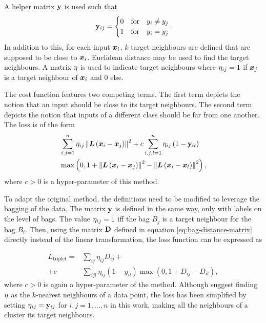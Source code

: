A helper matrix \( \mathbf{y} \) is used such that
\[ \phantom{.}\mathbf{y}_{ij} = \begin{cases}
	0 &\text{for} \quad y_i \neq y_j \\
	1 &\text{for} \quad y_i = y_j \\
\end{cases}. \]
In addition to this, for each input \( \bm{x}_i \), \( k \) target neighbours are defined that are supposed to be close to \( \bm{x}_i \). Euclidean distance may be used to find the target neighbours. A matrix \( \mathbf{\eta} \) is used to indicate target neighbours where \( \mathbf{\eta}_{ij} = 1 \) if \( \bm{x}_j \) is a target neighbour of \( \bm{x}_i \) and \( 0 \) else.

The cost function features two competing terms. The first term depicts the notion that an input should be close to its target neighbours. The second term depicts the notion that inputs of a different class should be far from one another. The loss is of the form
\begin{align*}
	&\sum_{i, j = 1}^n \mathbf{\eta}_{ij} \left\lVert \bm{L} \left( \bm{x}_i - \bm{x}_j \right) \right\rVert^2 + c \sum_{i, j, l = 1}^n \mathbf{\eta}_{ij} \left( 1 - \mathbf{y}_{il} \right) \\
	&\max \left( 0, 1 + \left\lVert \bm{L} \left( \bm{x}_i - \bm{x}_j \right) \right\rVert^2 - \left\lVert \bm{L} \left( \bm{x}_i - \bm{x}_l \right) \right\rVert^2 \right),
\end{align*}
where \( c > 0 \) is a hyper-parameter of this method.

To adapt the original method, the definitions need to be modified to leverage the bagging of the data. The matrix \( \mathbf{y} \) is defined in the same way, only with labels on the level of bags. The value \( \mathbf{\eta}_{ij} = 1 \) iff the bag \( B_j \) is a target neighbour for the bag \( B_i \). Then, using the matrix \( \mathbf{D} \) defined in equation \ref{eq:bag-distance-matrix} directly instead of the linear transformation, the loss function can be expressed as

\begin{align}
	L_\mathrm{triplet} = &\sum_{ij} \eta_{ij} D_{ij} + \nonumber \\
	+ c &\sum_{ijl} \eta_{ij} \left( 1 - y_{il} \right) \max \left( 0, 1 + D_{ij} - D_{il} \right),
\end{align}
where \( c > 0 \) is again a hyper-parameter of the method. Although \cite{weinberger_distance_2006} suggest finding \( \mathbf{\eta} \) as the \( k \)-nearest neighbours of a data point, the loss has been simplified by setting \( \mathbf{\eta}_{ij} = \mathbf{y}_{ij} \) for \( i, j = 1, \dots, n \) in this work, making all the neighbours of a cluster its target neighbours.


